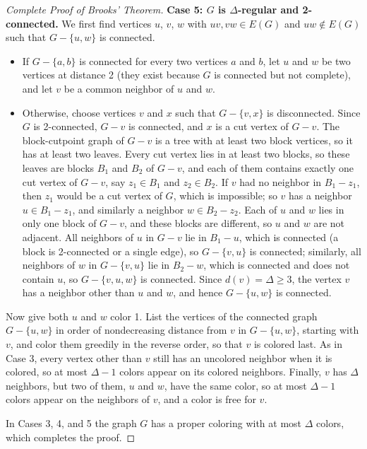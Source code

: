 \documentclass{article}
\theoremstyle{definition}
\begin{document}
\begin{proof}[Complete Proof of Brooks' Theorem]
\textbf{Case 5: $G$ is $\Delta$-regular and 2-connected.} We first find vertices $u$, $v$, $w$ with $uv, vw \in E(G)$ and $uw \notin E(G)$ such that $G - \{u, w\}$ is connected.
\begin{itemize}
    \item If $G - \{a, b\}$ is connected for every two vertices $a$ and $b$, let $u$ and $w$ be two vertices at distance 2 (they exist because $G$ is connected but not complete), and let $v$ be a common neighbor of $u$ and $w$.
    \item Otherwise, choose vertices $v$ and $x$ such that $G - \{v, x\}$ is disconnected. Since $G$ is 2-connected, $G - v$ is connected, and $x$ is a cut vertex of $G - v$. The block-cutpoint graph of $G - v$ is a tree with at least two block vertices, so it has at least two leaves. Every cut vertex lies in at least two blocks, so these leaves are blocks $B_1$ and $B_2$ of $G - v$, and each of them contains exactly one cut vertex of $G - v$, say $z_1 \in B_1$ and $z_2 \in B_2$. If $v$ had no neighbor in $B_1 - z_1$, then $z_1$ would be a cut vertex of $G$, which is impossible; so $v$ has a neighbor $u \in B_1 - z_1$, and similarly a neighbor $w \in B_2 - z_2$. Each of $u$ and $w$ lies in only one block of $G - v$, and these blocks are different, so $u$ and $w$ are not adjacent. All neighbors of $u$ in $G - v$ lie in $B_1 - u$, which is connected (a block is 2-connected or a single edge), so $G - \{v, u\}$ is connected; similarly, all neighbors of $w$ in $G - \{v, u\}$ lie in $B_2 - w$, which is connected and does not contain $u$, so $G - \{v, u, w\}$ is connected. Since $d(v) = \Delta \geq 3$, the vertex $v$ has a neighbor other than $u$ and $w$, and hence $G - \{u, w\}$ is connected.
\end{itemize}
Now give both $u$ and $w$ color 1. List the vertices of the connected graph $G - \{u, w\}$ in order of nondecreasing distance from $v$ in $G - \{u, w\}$, starting with $v$, and color them greedily in the reverse order, so that $v$ is colored last. As in Case 3, every vertex other than $v$ still has an uncolored neighbor when it is colored, so at most $\Delta - 1$ colors appear on its colored neighbors. Finally, $v$ has $\Delta$ neighbors, but two of them, $u$ and $w$, have the same color, so at most $\Delta - 1$ colors appear on the neighbors of $v$, and a color is free for $v$.

In Cases 3, 4, and 5 the graph $G$ has a proper coloring with at most $\Delta$ colors, which completes the proof.
\end{proof}
\end{document}
